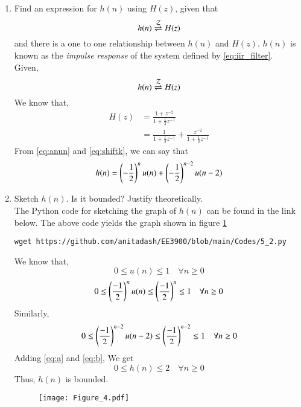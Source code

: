 \documentclass[journal,12pt,twocolumn]{IEEEtran}
\renewcommand\thesection{\arabic{section}}
\begin{document}
\begin{enumerate}[label=\thesection.\arabic*]
\item \label{prob:impulse_resp}
Find an expression for $h(n)$ using $H(z)$, given that 
\begin{equation}
\label{eq:impulse_resp}
h(n) \overset{\mathcal{Z}}{ \rightleftharpoons} H(z)
\end{equation}
and there is a one to one relationship between $h(n)$ and $H(z)$. $h(n)$ is known as the {\em impulse response} of the
system defined by \eqref{eq:iir_filter}.
\\
\solution Given,
\begin{equation}
\label{eq:impulse_resp}
h(n) \overset{\mathcal{Z}}{ \rightleftharpoons} H(z)
\end{equation}
We know that,
\begin{align}
    H(z) &= \frac{1 + z^{-2}}{1 + \frac{1}{2}z^{-1}}
    \\
    &= \frac{1}{1 + \frac{1}{2}z^{-1}} + \frac{z^{-2}}{1 + \frac{1}{2}z^{-1}}    
\end{align}
From \eqref{eq:anun} and \eqref{eq:shiftk}, we can say that
\begin{equation}
    h(n) = \left(-\frac{1}{2}\right)^{n}u(n) + \left(-\frac{1}{2}\right)^{n-2}u(n-2) 
\end{equation}


\item Sketch $h(n)$. Is it bounded? Justify theoretically.
\\
\solution The Python code for sketching the graph of $h(n)$ can be found in the link below. The above code yields the graph shown in figure \ref{fig:4}
\begin{lstlisting}
wget https://github.com/anitadash/EE3900/blob/main/Codes/5_2.py
\end{lstlisting}
We know that,
\begin{equation}
    0 \le u(n) \le 1  \quad \forall n \ge 0    
\end{equation}
\begin{equation}
\label{eq:a}
    0 \le \left(\frac{-1}{2}\right)^{n}u(n) \le \left(\frac{-1}{2}\right)^{n} \le 1  \quad \forall n \ge 0
\end{equation}
Similarly,
\begin{equation}
\label{eq:b}
    0 \le \left(\frac{-1}{2}\right)^{n-2}u(n-2)\le \left(\frac{-1}{2}\right)^{n-2} \le 1  \quad \forall n \ge 0
\end{equation}
Adding \eqref{eq:a} and \eqref{eq:b}, We get
\begin{equation}
    0 \le h(n) \le 2  \quad \forall n \ge 0
\end{equation}
Thus, $h(n)$ is bounded.
\begin{figure}[!ht]
\begin{center}
\texttt{[image: Figure\_4.pdf]}
\end{center}
\label{fig:4}	
\end{figure}



\end{enumerate}
\end{document}
